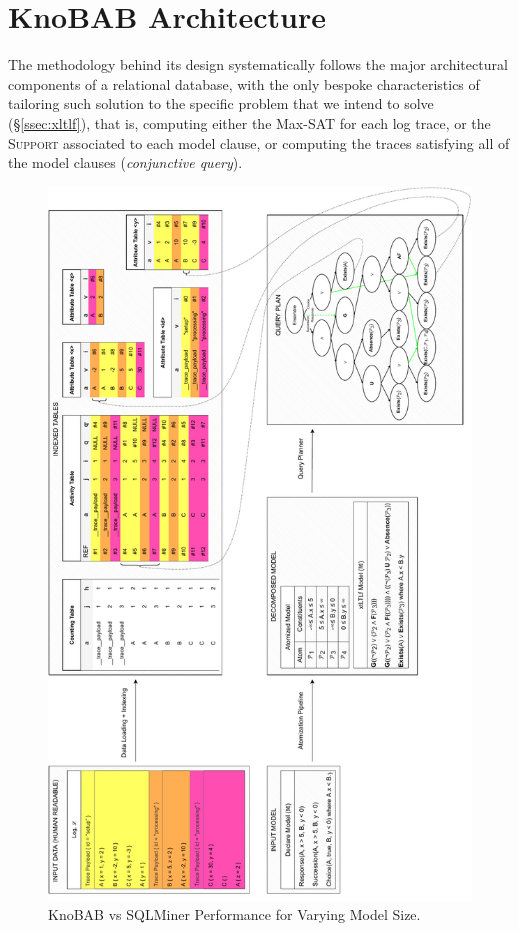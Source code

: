 \section{KnoBAB Architecture}\label{sec:karch}
The methodology behind its design systematically follows the major architectural components of a relational database, with the only bespoke characteristics of tailoring such solution to the specific problem that we intend to solve (\S\ref{ssec:xltlf}), that is, computing either the Max-SAT for each log trace,  or the \textsc{Support} associated to each model clause, or computing the traces satisfying all of the model clauses (\textit{conjunctive query}).

\begin{figure}[!t]
	\centering
	\includegraphics[width=.7\textwidth]{images/knobab_pipeline.pdf}
	\caption{KnoBAB vs SQLMiner Performance for Varying Model Size.}\label{fig:vsSQL}
\end{figure}

